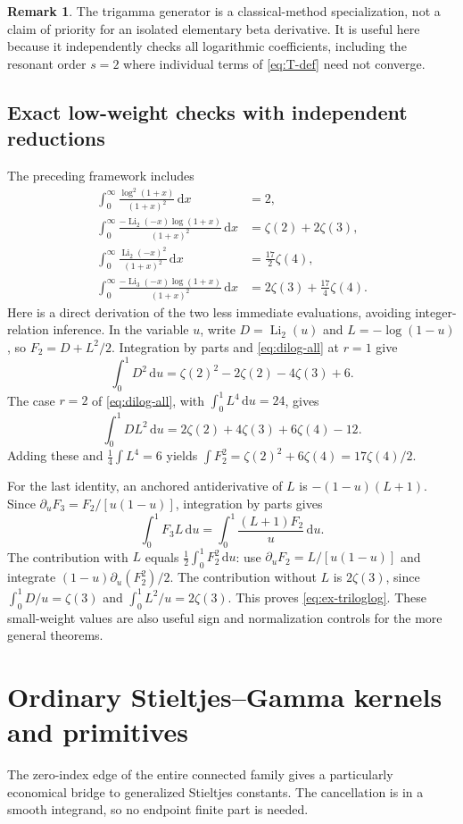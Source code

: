 \documentclass[11pt]{article}
\numberwithin{equation}{section}
\theoremstyle{definition}
\newtheorem{remark}[theorem]{Remark}
\DeclareMathOperator{\Li}{Li}
\newcommand{\dd}{\,\mathrm d}
\begin{document}
\begin{remark}
The trigamma generator is a classical-method specialization, not a claim of priority for an isolated elementary beta derivative. It is useful here because it independently checks all logarithmic coefficients, including the resonant order $s=2$ where individual terms of \eqref{eq:T-def} need not converge.
\end{remark}

\subsection{Exact low-weight checks with independent reductions}
The preceding framework includes
\begin{align}
 \int_0^\infty\frac{\log^2(1+x)}{(1+x)^2}\dd x&=2,\label{eq:ex-log2}\\
 \int_0^\infty\frac{-\Li_2(-x)\log(1+x)}{(1+x)^2}\dd x
 &=\zeta(2)+2\zeta(3),\label{eq:ex-diloglog}\\
 \int_0^\infty\frac{\Li_2(-x)^2}{(1+x)^2}\dd x
 &=\frac{17}{2}\zeta(4),\label{eq:ex-dilogsquare}\\
 \int_0^\infty\frac{-\Li_3(-x)\log(1+x)}{(1+x)^2}\dd x
 &=2\zeta(3)+\frac{17}{4}\zeta(4).\label{eq:ex-triloglog}
\end{align}
Here is a direct derivation of the two less immediate evaluations, avoiding integer-relation inference. In the variable $u$, write $D=\Li_2(u)$ and $L=-\log(1-u)$, so $F_2=D+L^2/2$. Integration by parts and \eqref{eq:dilog-all} at $r=1$ give
\[
 \int_0^1D^2\dd u=\zeta(2)^2-2\zeta(2)-4\zeta(3)+6.
\]
The case $r=2$ of \eqref{eq:dilog-all}, with $\int_0^1L^4\dd u=24$, gives
\[
 \int_0^1DL^2\dd u=2\zeta(2)+4\zeta(3)+6\zeta(4)-12.
\]
Adding these and $\frac14\int L^4=6$ yields
$\int F_2^2=\zeta(2)^2+6\zeta(4)=17\zeta(4)/2$.

For the last identity, an anchored antiderivative of $L$ is $-(1-u)(L+1)$. Since $\partial_u F_3=F_2/[u(1-u)]$, integration by parts gives
\[
 \int_0^1F_3 L\dd u=\int_0^1\frac{(L+1)F_2}{u}\dd u.
\]
The contribution with $L$ equals $\frac12\int_0^1F_2^2\dd u$: use $\partial_uF_2=L/[u(1-u)]$ and integrate $(1-u)\partial_u(F_2^2)/2$. The contribution without $L$ is $2\zeta(3)$, since
$\int_0^1D/u=\zeta(3)$ and $\int_0^1L^2/u=2\zeta(3)$. This proves \eqref{eq:ex-triloglog}. These small-weight values are also useful sign and normalization controls for the more general theorems.

\section{Ordinary Stieltjes--Gamma kernels and primitives}\label{sec:Stieltjes}
The zero-index edge of the entire connected family gives a particularly economical bridge to generalized Stieltjes constants. The cancellation is in a smooth integrand, so no endpoint finite part is needed.
\end{document}

